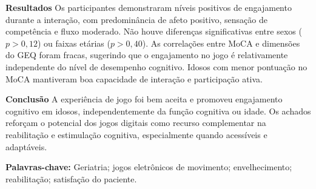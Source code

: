 \documentclass[12pt,a4paper]{article}
\begin{document}
\textbf{Resultados} Os participantes demonstraram níveis positivos de engajamento
durante a interação, com predominância de afeto positivo, sensação de competência e
fluxo moderado. Não houve diferenças significativas entre sexos ($p>0,12$) ou faixas
etárias ($p>0,40$). As correlações entre MoCA e dimensões do GEQ foram fracas,
sugerindo que o engajamento no jogo é relativamente independente do nível de
desempenho cognitivo. Idosos com menor pontuação no MoCA mantiveram boa capacidade
de interação e participação ativa.

\textbf{Conclusão} A experiência de jogo foi bem aceita e promoveu engajamento
cognitivo em idosos, independentemente da função cognitiva ou idade. Os achados
reforçam o potencial dos jogos digitais como recurso complementar na reabilitação e
estimulação cognitiva, especialmente quando acessíveis e adaptáveis.

\textbf{Palavras-chave:} Geriatria; jogos eletrônicos de movimento; envelhecimento;
reabilitação; satisfação do paciente.
\end{document}
